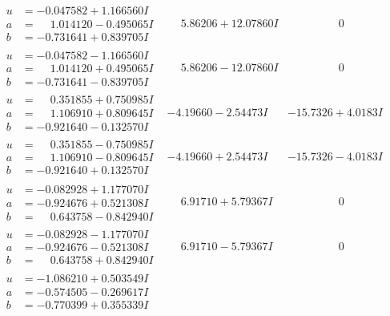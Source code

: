 \documentclass[1p]{elsarticle_modified}
\theoremstyle{definition}
\begin{document}
$$\begin{array}{c|c|c}
\begin{aligned}
u &= -0.047582 + 1.166560 I \\
a &= \phantom{-}1.014120 - 0.495065 I \\
b &= -0.731641 + 0.839705 I\end{aligned}
 & \phantom{-}5.86206 + 12.07860 I & \phantom{-0.000000 } 0 \\ \hline\begin{aligned}
u &= -0.047582 - 1.166560 I \\
a &= \phantom{-}1.014120 + 0.495065 I \\
b &= -0.731641 - 0.839705 I\end{aligned}
 & \phantom{-}5.86206 - 12.07860 I & \phantom{-0.000000 } 0 \\ \hline\begin{aligned}
u &= \phantom{-}0.351855 + 0.750985 I \\
a &= \phantom{-}1.106910 + 0.809645 I \\
b &= -0.921640 - 0.132570 I\end{aligned}
 & -4.19660 - 2.54473 I & -15.7326 + 4.0183 I \\ \hline\begin{aligned}
u &= \phantom{-}0.351855 - 0.750985 I \\
a &= \phantom{-}1.106910 - 0.809645 I \\
b &= -0.921640 + 0.132570 I\end{aligned}
 & -4.19660 + 2.54473 I & -15.7326 - 4.0183 I \\ \hline\begin{aligned}
u &= -0.082928 + 1.177070 I \\
a &= -0.924676 + 0.521308 I \\
b &= \phantom{-}0.643758 - 0.842940 I\end{aligned}
 & \phantom{-}6.91710 + 5.79367 I & \phantom{-0.000000 } 0 \\ \hline\begin{aligned}
u &= -0.082928 - 1.177070 I \\
a &= -0.924676 - 0.521308 I \\
b &= \phantom{-}0.643758 + 0.842940 I\end{aligned}
 & \phantom{-}6.91710 - 5.79367 I & \phantom{-0.000000 } 0 \\ \hline\begin{aligned}
u &= -1.086210 + 0.503549 I \\
a &= -0.574505 - 0.269617 I \\
b &= -0.770399 + 0.355339 I\end{aligned}

\end{array}$$
\end{document}

